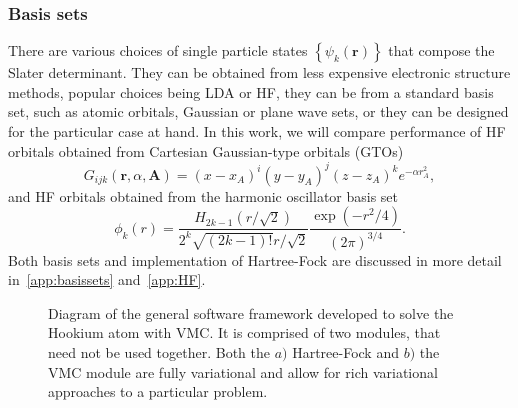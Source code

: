\documentclass[final,3p,times,twocolumn]{elsarticle}
\begin{document}
	\subsubsection{Basis sets}
	There are various choices of single particle states $\left\{\psi_k(\mathbf{r})\right\}$ that compose the Slater determinant. They can be obtained from less expensive electronic structure methods, popular choices being LDA or HF, they can be from a standard basis set, such as atomic orbitals, Gaussian or plane wave sets, or they can be designed for the particular case at hand. In this work, we will compare performance of HF orbitals obtained from Cartesian Gaussian-type orbitals (GTOs)
	\begin{equation}
	G_{i j k}(\mathbf{r}, \alpha, \mathbf{A})=(x-x_{A})^{i} (y-y_{A})^{j} (z-z_{A})^{k} e^{-\alpha r_{A}^{2}},
	\end{equation}
	and HF orbitals obtained from the harmonic oscillator basis set
	\begin{equation}
		\phi_{k}(r)=\frac{H_{2 k-1}(r / \sqrt{2})}{2^{k} \sqrt{(2 k-1) !} r / \sqrt{2}} \frac{\exp \left(-r^{2} / 4\right)}{(2 \pi)^{3 / 4}}.
	\end{equation}
	Both basis sets and implementation of Hartree-Fock are discussed in more detail in~\ref{app:basissets} and~\ref{app:HF}.  
	
	\begin{figure}[h]
		\vspace*{-2cm}
		\caption{Diagram of the general software framework developed to solve the Hookium atom with VMC. It is comprised of two modules, that need not be used together. Both the $a)$ Hartree-Fock and $b)$ the VMC module are fully variational and allow for rich variational approaches to a particular problem.}
	\end{figure}
	
\end{document}
